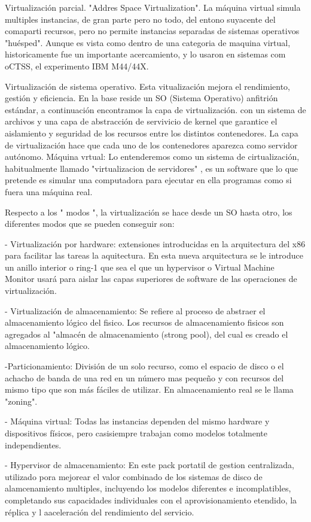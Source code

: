 Virtualización parcial. "Addres Space Virtualization". La máquina virtual simula multiples instancias, de gran parte pero no todo, del entono suyacente del comaparti recursos, pero no permite instancias separadas de sistemas operativos "huésped". Aunque es vista como dentro de una categoria de maquina virtual, historicamente fue un importante acercamiento, y lo usaron en sistemas com oCTSS, el experimento IBM M44/44X.

Virtualización de sistema operativo.
	Esta vitualización mejora el rendimiento, gestión y eficiencia. En la base reside un SO (Sistema Operativo) anfitrión estándar, a continuación encontramos la capa de virtualización. con un sistema de archivos y una capa de abstracción de servivicio de kernel que garantice el aislamiento y seguridad de los recursos entre los distintos contenedores. La capa de virtualización hace que cada uno de los contenedores aparezca como servidor autónomo.
Máquina vrtual: Lo entenderemos como un sistema de cirtualización, habitualmente llamado "virtualizacion de servidores"	, es un software que lo que pretende es simular una computadora para ejecutar en ella programas como si fuera una máquina real.

	Respecto a los " modos ", la virtualización se hace desde un SO hasta otro, los diferentes modos que se pueden conseguir son:
	
	- Virtualización por hardware: extensiones introducidas en la arquitectura del x86 para facilitar las tareas la aquitectura. En esta nueva arquitectura se le introduce un anillo interior o ring-1 que sea el que un hypervisor o Virtual Machine Monitor usará para aislar las capas superiores de software de las operaciones de virtualización.
	
	- Virtualización de almacenamiento: Se refiere al proceso de abstraer el almacenamiento lógico del fisico. Los recursos de almacenamiento fisicos son agregados al "almacén de almacenamiento (strong pool),  del cual es creado el almacenamiento lógico.
	
	-Particionamiento: División de un solo recurso, como el espacio de disco o el achacho de banda de una red en un número mas pequeño y con recursos del mismo tipo que son más fáciles de utilizar. En almacenamiento real se le llama "zoning".
	
	- Máquina virtual: Todas las instancias dependen del mismo hardware y dispositivos físicos, pero casisiempre trabajan como modelos totalmente independientes.
	
	- Hypervisor de almacenamiento: En este pack portatil de gestion centralizada, utilizado pora mejorear el valor combinado de los sistemas de disco de alamcenamiento multiples, incluyendo los modelos diferentes e incomplatibles, completando sus capacidades individuales con el aprovisionamiento etendido, la réplica y l aaceleración del rendimiento del servicio. 



